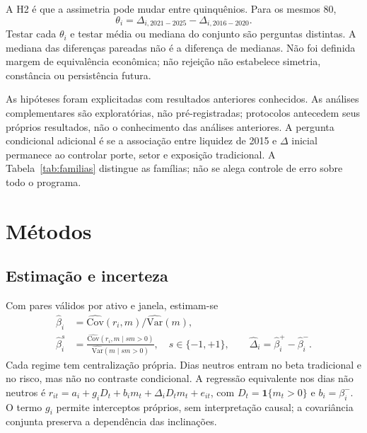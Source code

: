 A H2 é que a assimetria pode mudar entre quinquênios. Para os mesmos 80,
\begin{equation}
\theta_i=\Delta_{i, 2021-2025}-\Delta_{i, 2016-2020}.
\end{equation}
Testar cada $\theta_i $ e testar média ou mediana do conjunto são perguntas
distintas. A mediana das diferenças pareadas não é a diferença de medianas.
Não foi definida margem de equivalência econômica; não rejeição não
estabelece simetria, constância ou persistência futura.

As hipóteses foram explicitadas com resultados anteriores conhecidos.
As análises complementares são exploratórias, não pré-registradas;
protocolos antecedem seus próprios resultados, não o conhecimento das
análises anteriores. A pergunta condicional adicional é se a associação
entre liquidez de 2015 e $\Delta$ inicial permanece ao controlar porte,
setor e exposição tradicional. A Tabela~\ref{tab:familias} distingue as
famílias; não se alega controle de erro sobre todo o programa.

\begin{table}[htbp]\centering\footnotesize
\caption{Alvos e multiplicidade. Ajustes separados por bloco, salvo HAC.
ICs bootstrap são marginais nominais, não intervalos simultâneos.}
\label{tab:familias}
\end{table}

\section{Métodos}
\subsection{Estimação e incerteza}
Com pares válidos por ativo e janela, estimam-se
\begin{align}
\widehat\beta_i&=\widehat{\mathrm{Cov}}(r_i,m)/\widehat{\mathrm{Var}}(m),\\
\widehat\beta_i^{s}&=\frac{\widehat{\mathrm{Cov}}(r_i,m\mid sm>0)}{\widehat{\mathrm{Var}}(m\mid sm>0)},\quad s\in\{-1,+1\},\qquad
\widehat\Delta_i=\widehat\beta_i^+-\widehat\beta_i^-.
\end{align}
Cada regime tem centralização própria. Dias neutros entram no beta
tradicional e no risco, mas não no contraste condicional. A regressão equivalente nos dias não neutros é
$r_{it}=a_i+g_iD_t+b_im_t+\Delta_iD_tm_t+e_{it}$, com
$D_t=\mathbf{1}\{m_t>0\}$ e $b_i=\beta_i^-$.
O termo $g_i$ permite interceptos próprios, sem interpretação causal;
a covariância conjunta preserva a dependência das inclinações.

